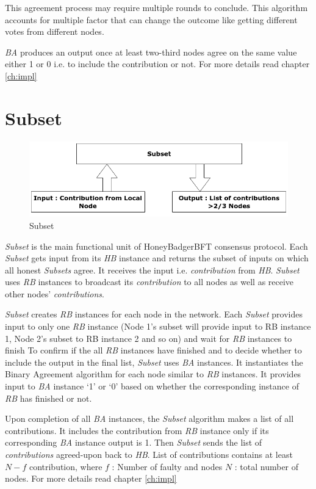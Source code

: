 This agreement process may require multiple rounds to conclude. This algorithm accounts for multiple factor that can change the outcome like getting different votes from different nodes.

\textit{BA} produces an output once at least two-third nodes agree on the same value either 1 or 0 i.e. to include the contribution or not.
For more details read chapter \ref{ch:impl}

\section{Subset}
\begin{figure}[!h]
    \centering
    \includegraphics[scale=0.5]{images/Subset.png}
    \caption{Subset\cite{POANetwork}}
    \label{fig:subset}
\end{figure}
\textit{Subset}\cite{ben1994asynchronous}\cite{POANetwork} is the main functional unit of HoneyBadgerBFT consensus protocol. Each \textit{Subset} gets input from its \textit{HB} instance and returns the subset of inputs on which all honest \textit{Subsets} agree.
It receives the input i.e. \textit{contribution} from \textit{HB}. \textit{Subset} uses \textit{RB} instances to broadcast its \textit{contribution} to all nodes as well as receive other nodes' \textit{contributions}.


\textit{Subset} creates \textit{RB} instances for each node in the network. Each \textit{Subset}  provides input to only one \textit{RB} instance (Node 1's subset will provide input to RB instance 1, Node 2's subset to RB instance 2 and so on) and wait for \textit{RB} instances to finish
To confirm if the all \textit{RB} instances have finished and to decide whether to include the output in the final list, \textit{Subset} uses \textit{BA} instances. It instantiates the Binary Agreement algorithm for each node similar to \textit{RB} instances.  It provides input to \textit{BA} instance `1' or `0' based on whether the corresponding instance of \textit{RB} has finished or not.


Upon completion of all \textit{BA} instances, the \textit{Subset} algorithm makes a list of all contributions. It includes the contribution from \textit{RB} instance only if its corresponding \textit{BA} instance output is 1.
Then \textit{Subset} sends the list of \textit{contributions} agreed-upon back to \textit{HB}.
List of contributions contains at least $N-f$ contribution, where $f$ : Number of faulty and nodes $N$ : total number of nodes.
For more details read chapter \ref{ch:impl}

